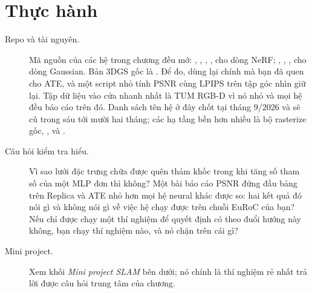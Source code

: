 \documentclass[../../deep_learning.tex]{subfiles}
\begin{document}
\section{Thực hành}
\begin{description}
\item[Repo và tài nguyên.] Mã nguồn của các hệ trong chương đều mở: , , , ,  cho dòng NeRF; , , ,  cho dòng Gaussian. Bản 3DGS gốc là . Để đo, dùng lại chính  mà bạn đã quen cho ATE, và một script nhỏ tính PSNR cùng LPIPS trên tập góc nhìn giữ lại. Tập dữ liệu vào cửa nhanh nhất là TUM RGB-D vì nó nhỏ và mọi hệ đều báo cáo trên đó. Danh sách tên hệ ở đây chốt tại tháng 9/2026 và sẽ cũ trong sáu tới mười hai tháng; các hạ tầng bền hơn nhiều là bộ rasterize gốc, , và .
\item[Câu hỏi kiểm tra hiểu.] Vì sao lưới đặc trưng chữa được quên thảm khốc trong khi tăng số tham số của một MLP đơn thì không? Một bài báo cáo PSNR đứng đầu bảng trên Replica và ATE nhỏ hơn mọi hệ neural khác được so: hai kết quả đó nói gì và không nói gì về việc hệ chạy được trên chuỗi EuRoC của bạn? Nếu chỉ được chạy một thí nghiệm để quyết định có theo đuổi hướng này không, bạn chạy thí nghiệm nào, và nó chặn trên cái gì?
\item[Mini project.] Xem khối \emph{Mini project SLAM} bên dưới; nó chính là thí nghiệm rẻ nhất trả lời được câu hỏi trung tâm của chương.
\end{description}
\end{document}
